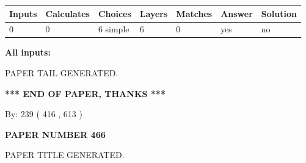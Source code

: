 \documentclass[12pt]{article}
\begin{document}
   
\noindent\begin{tabular}{|l|l|l|l|l|l|l|}
 \hline
Inputs & Calculates & Choices & Layers & Matches & Answer & Solution \\ \hline
 0  & 
 0  & 
 6
  simple  
  & 
 6  & 
 0  & 
  yes & 
  no 
  \\ \hline
 \end{tabular}
   
   
   
   
\noindent{}
   
   
   
   
\noindent\vspace{0.1in}\hspace{-0.08in} {\textbf{\Large{All inputs: }}}
   
   
   
   
   
   
 \vspace{0.2in}
 
   
   
\vspace{2.0in} PAPER TAIL GENERATED.
   
   
   
   
\vspace{1.0in} 
{\textbf{\large{ *** END OF PAPER, THANKS *** }}} 
   
   
\hspace{1.0in} By: 
 239 ( 416 ,  613 )
   
   
   
   
\newpage 
\setcounter{page}{ 
   466001 } 
   
   
   
   
 {\textbf{ \Large{ PAPER NUMBER  466  }}}
   
   
\vspace{0.2in}
   
   
   
   
   
   
   
   
 \vspace{0.2in}
 
 
 
 
   
   
 PAPER TITLE GENERATED.
   
   
   
\vspace{0.2in}
   
\end{document}
